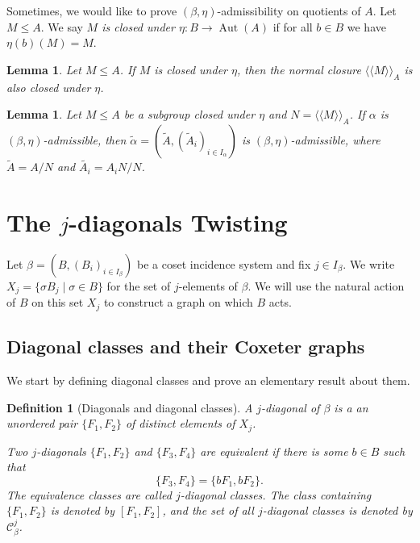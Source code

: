 \documentclass[11pt,letterpaper]{amsart}
\newtheorem{lemma}[prop]{Lemma}
\newtheorem{definition}[prop]{Definition}
\DeclareMathOperator{\Aut}{Aut}
\newcommand{\CC}{\mathcal{C}}
\begin{document}
Sometimes, we would like to prove $(\beta,\eta)$-admissibility on quotients of $A$. Let $M\leq A$. We say \emph{$M$ is closed under $\eta \colon B \to \Aut(A)$} if for all $b\in B$ we have $\eta(b)(M)= M$.

\begin{lemma}\cite[Lemma 5.8]{PiedadeTranchida_FromGroupOps2026}\label{lem:normalclosureClosedUnderGraphAut}
    Let $M\leq A$.
    If $M$ is closed under $\eta$, then the normal closure $\langle\langle M\rangle\rangle_A$ is also closed under $\eta$.
\end{lemma}

\begin{lemma}\cite[adapted from Proposition 5.10]{PiedadeTranchida_FromGroupOps2026}\label{lem:quotient-admissible}
    Let $M\leq A$ be a subgroup closed under $\eta$ and $N = \langle\langle M\rangle\rangle_A$.
    If $\alpha$ is $(\beta,\eta)$-admissible, then $\tilde{\alpha}=(\tilde{A},(\tilde{A}_i)_{i\in I_\alpha})$ is $(\beta,\eta)$-admissible, where $\tilde{A}=A/N$ and $\tilde{A_i} = A_iN/N$.
\end{lemma}





\section{The $j$-diagonals Twisting}\label{sec:twisting}

Let $\beta=(B,(B_i)_{i\in I_\beta})$ be a coset incidence system and fix $j\in I_\beta$. We write $X_j=\{\sigma B_j\mid \sigma \in B\}$
for the set of $j$-elements of $\beta$. We will use the natural action of $B$ on this set $X_j$ to construct a graph on which $B$ acts.

\subsection{Diagonal classes and their Coxeter graphs}\label{subsec:diagonals}

We start by defining diagonal classes and prove an elementary result about them. 

\begin{definition}[Diagonals and diagonal classes]\label{def:diagonal}
A \emph{$j$-diagonal} of $\beta$ is a an unordered pair $\{F_1,F_2\}$ of distinct elements of $X_j$.

Two $j$-diagonals $\{F_1,F_2\}$ and $\{F_3,F_4\}$ are \emph{equivalent} if there is some $b\in B$ such that
\[
\{F_3,F_4\}=\{bF_1,bF_2\}.
\]
The equivalence classes are called \emph{$j$-diagonal classes}. The class containing $\{F_1,F_2\}$ is denoted by $[F_1,F_2]$, and the set of all $j$-diagonal classes is denoted by $\CC^j_\beta$.
\end{definition}
\end{document}
